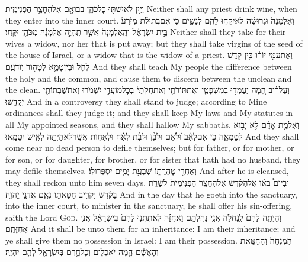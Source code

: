 {וְיַ֥יִן לֹא\maqqaf יִשְׁתּ֖וּ כׇּל\maqqaf כֹּהֵ֑ן בְּבוֹאָ֖ם אֶל\maqqaf הֶחָצֵ֥ר הַפְּנִימִֽית׃}
{Neither shall any priest drink wine, when they enter into the inner court.}
{וְאַלְמָנָה֙ וּגְרוּשָׁ֔ה לֹא\maqqaf יִקְח֥וּ לָהֶ֖ם לְנָשִׁ֑ים כִּ֣י אִם\maqqaf בְּתוּלֹ֗ת מִזֶּ֙רַע֙ בֵּ֣ית יִשְׂרָאֵ֔ל וְהָֽאַלְמָנָה֙ אֲשֶׁ֣ר תִּֽהְיֶ֣ה אַלְמָנָ֔ה מִכֹּהֵ֖ן יִקָּֽחוּ׃}
{Neither shall they take for their wives a widow, nor her that is put away; but they shall take virgins of the seed of the house of Israel, or a widow that is the widow of a priest.}
{וְאֶת\maqqaf עַמִּ֣י יוֹר֔וּ בֵּ֥ין קֹ֖דֶשׁ לְחֹ֑ל וּבֵין\maqqaf טָמֵ֥א לְטָה֖וֹר יֽוֹדִעֻֽם׃}
{And they shall teach My people the difference between the holy and the common, and cause them to discern between the unclean and the clean.}
{וְעַל\maqqaf רִ֗יב הֵ֚מָּה יַעַמְד֣וּ  בְּמִשְׁפָּטַ֖י  וְאֶת\maqqaf תּוֹרֹתַ֤י וְאֶת\maqqaf חֻקֹּתַי֙ בְּכׇל\maqqaf מוֹעֲדַ֣י יִשְׁמֹ֔רוּ וְאֶת\maqqaf שַׁבְּתוֹתַ֖י יְקַדֵּֽשׁוּ׃}
{And in a controversy they shall stand to judge; according to Mine ordinances shall they judge it; and they shall keep My laws and My statutes in all My appointed seasons, and they shall hallow My sabbaths.}
{וְאֶל\maqqaf מֵ֣ת אָדָ֔ם לֹ֥א יָב֖וֹא לְטׇמְאָ֑ה כִּ֣י אִם\maqqaf לְאָ֡ב וּ֠לְאֵ֠ם וּלְבֵ֨ן וּלְבַ֜ת לְאָ֗ח וּלְאָח֛וֹת אֲשֶֽׁר\maqqaf לֹא\maqqaf הָיְתָ֥ה לְאִ֖ישׁ יִטַּמָּֽאוּ׃}
{And they shall come near no dead person to defile themselves; but for father, or for mother, or for son, or for daughter, for brother, or for sister that hath had no husband, they may defile themselves.}
{וְאַחֲרֵ֖י טׇהֳרָת֑וֹ שִׁבְעַ֥ת יָמִ֖ים יִסְפְּרוּ\maqqaf לֽוֹ׃}
{And after he is cleansed, they shall reckon unto him seven days.}
{וּבְיוֹם֩ בֹּא֨וֹ אֶל\maqqaf הַקֹּ֜דֶשׁ אֶל\maqqaf הֶחָצֵ֤ר הַפְּנִימִית֙ לְשָׁרֵ֣ת בַּקֹּ֔דֶשׁ יַקְרִ֖יב חַטָּאת֑וֹ נְאֻ֖ם אֲדֹנָ֥י יֱהֹוִֽה׃}
{And in the day that he goeth into the sanctuary, into the inner court, to minister in the sanctuary, he shall offer his sin-offering, saith the Lord \textsc{God}.}
{וְהָיְתָ֤ה לָהֶם֙ לְֽנַחֲלָ֔ה אֲנִ֖י נַחֲלָתָ֑ם וַאֲחֻזָּ֗ה לֹֽא\maqqaf תִתְּנ֤וּ לָהֶם֙ בְּיִשְׂרָאֵ֔ל אֲנִ֖י אֲחֻזָּתָֽם׃}
{And it shall be unto them for an inheritance: I am their inheritance; and ye shall give them no possession in Israel: I am their possession.}
{הַמִּנְחָה֙ וְהַחַטָּ֣את וְהָאָשָׁ֔ם הֵ֖מָּה יֹאכְל֑וּם וְכׇל\maqqaf חֵ֥רֶם בְּיִשְׂרָאֵ֖ל לָהֶ֥ם יִהְיֶֽה׃}
